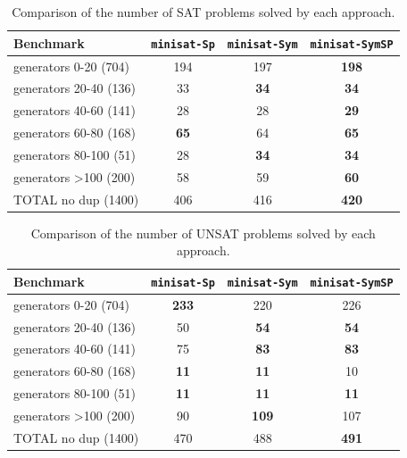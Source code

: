 \begin{table}\footnotesize
	\centering
	\begin{tabular}{l|ccc}
		\toprule
		Benchmark  &\texttt{minisat-Sp} & \texttt{minisat-Sym} & \texttt{minisat-SymSP}\\
		\hline 
		generators 0-20 (704) & 194&197&\cellcolor{gray!30}\textbf{198}\\
		generators 20-40 (136) & 33&\cellcolor{gray!30}\textbf{34}&\cellcolor{gray!30}\textbf{34}\\
		generators 40-60 (141) & 28&28&\cellcolor{gray!30}\textbf{29}\\
		generators 60-80 (168) & \cellcolor{gray!30}\textbf{65}&64&\cellcolor{gray!30}\textbf{65}\\
		generators 80-100 (51) & 28&\cellcolor{gray!30}\textbf{34}&\cellcolor{gray!30}\textbf{34}\\
		generators  \textgreater100 (200) & 58&59&\cellcolor{gray!30}\textbf{60}\\
		\hline 
		TOTAL no dup (1400) & 406 & 416 & \cellcolor{gray!30}\textbf{420}\\
		\bottomrule
	\end{tabular}
	\caption{Comparison of the number of SAT problems solved by each approach.}
	\label{tab:sat}
\end{table}

\begin{table}\footnotesize
	\centering
	\begin{tabular}{l|ccc}
		\toprule
		Benchmark  &\texttt{minisat-Sp} & \texttt{minisat-Sym} & \texttt{minisat-SymSP}\\
		\hline 
		generators 0-20 (704) & \cellcolor{gray!30}\textbf{233}&220&226\\
		generators 20-40 (136) & 50&\cellcolor{gray!30}\textbf{54}&\cellcolor{gray!30}\textbf{54}\\
		generators 40-60 (141) & 75&\cellcolor{gray!30}\textbf{83}&\cellcolor{gray!30}\textbf{83}\\
		generators 60-80 (168) & \cellcolor{gray!30}\textbf{11}&\cellcolor{gray!30}\textbf{11}&10\\
		generators 80-100 (51) & \cellcolor{gray!30}\textbf{11}&\cellcolor{gray!30}\textbf{11}&\cellcolor{gray!30}\textbf{11}\\
		generators \textgreater100 (200) & 90&\cellcolor{gray!30}\textbf{109}&107\\
		\hline 
		TOTAL no dup (1400) & 470&488&\cellcolor{gray!30}\textbf{491}\\
		\bottomrule
	\end{tabular}
	\caption{Comparison of the number of UNSAT problems solved by each approach.}
	\label{tab:unsat}
\end{table}


